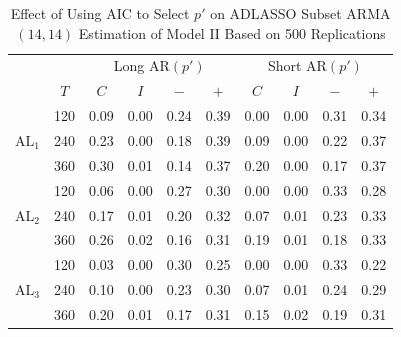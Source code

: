 \begin{table}[ht!]
\caption{Effect of Using AIC to Select $p'$ on ADLASSO Subset ARMA$(14,14)$ Estimation of Model II Based on 500 Replications}
\centering
\begin{tabular}{cc|cccc|cccc}
  \hline
    & & \multicolumn{4}{c|}{Long AR$(p')$} & \multicolumn{4}{c}{Short AR$(p')$} \\
      \cline{4-5}  \cline{8-9}
  & $T$ & $C$ & $I$ & $-$ & $+$ & $C$ & $I$ & $-$ & $+$\\
  \hline
  \multirow{3}{*}{$\textrm{AL}_1$} & 120 & 0.09 & 0.00 & 0.24 & 0.39 & 0.00 & 0.00 & 0.31 & 0.34 \\ 
  & 240 & 0.23 & 0.00 & 0.18 & 0.39 & 0.09 & 0.00 & 0.22 & 0.37 \\ 
  & 360 & 0.30 & 0.01 & 0.14 & 0.37 & 0.20 & 0.00 & 0.17 & 0.37 \\ 
  \hline
  \multirow{3}{*}{$\textrm{AL}_2$} & 120 & 0.06 & 0.00 & 0.27 & 0.30 & 0.00 & 0.00 & 0.33 & 0.28 \\ 
  & 240 & 0.17 & 0.01 & 0.20 & 0.32 & 0.07 & 0.01 & 0.23 & 0.33 \\ 
  & 360 & 0.26 & 0.02 & 0.16 & 0.31 & 0.19 & 0.01 & 0.18 & 0.33 \\ 
  \hline
  \multirow{3}{*}{$\textrm{AL}_3$} & 120 & 0.03 & 0.00 & 0.30 & 0.25 & 0.00 & 0.00 & 0.33 & 0.22 \\ 
  & 240 & 0.10 & 0.00 & 0.23 & 0.30 & 0.07 & 0.01 & 0.24 & 0.29 \\ 
  & 360 & 0.20 & 0.01 & 0.17 & 0.31 & 0.15 & 0.02 & 0.19 & 0.31 \\ 
   \hline
\end{tabular}
\label{tab:longvsshort2}
\end{table}

